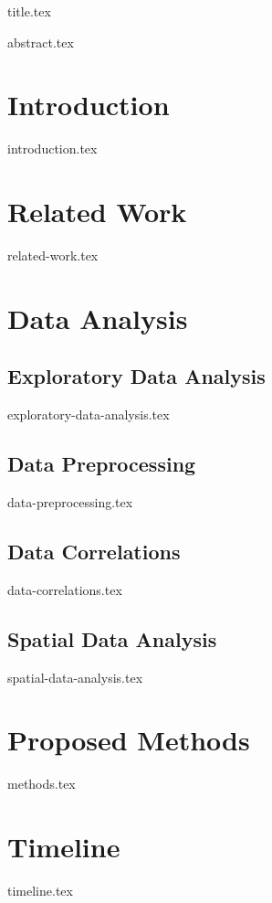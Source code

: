 \documentclass[a4paper, 11pt]{article}
\begin{document}
{title.tex}
\pagebreak

{abstract.tex}

\thispagestyle{empty}
\setcounter{tocdepth}{2}
\tableofcontents{}
\pagebreak

\setcounter{page}{1}

\section{Introduction}
{introduction.tex}
\clearpage

\section{Related Work}
{related-work.tex}
\clearpage

\section{Data Analysis}
\subsection{Exploratory Data Analysis}
{exploratory-data-analysis.tex}

\subsection{Data Preprocessing}
{data-preprocessing.tex}

\subsection{Data Correlations}
{data-correlations.tex}

\subsection{Spatial Data Analysis}
{spatial-data-analysis.tex}

\clearpage

\section{Proposed Methods}
{methods.tex}
\clearpage

\section{Timeline}
{timeline.tex}
\clearpage

\printbibliography
\end{document}
